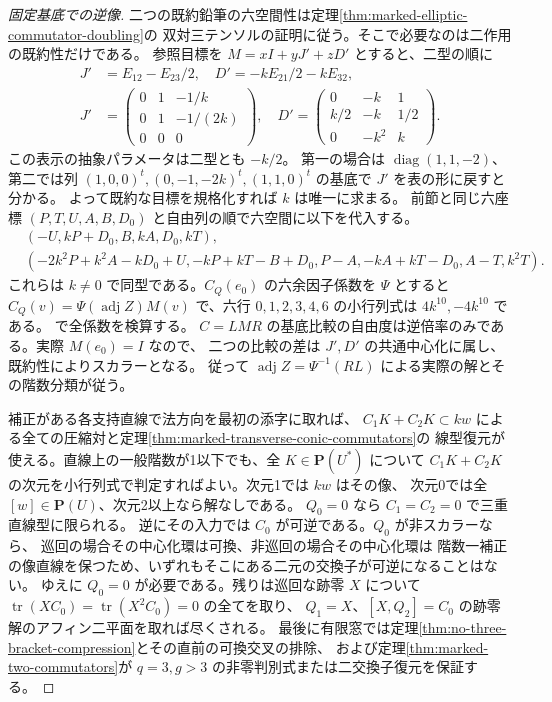 \begin{proof}[固定基底での逆像]
二つの既約鉛筆の六空間性は定理\ref{thm:marked-elliptic-commutator-doubling}の
双対三テンソルの証明に従う。そこで必要なのは二作用の既約性だけである。
参照目標を $M=xI+yJ'+zD'$ とすると、二型の順に
\[
\begin{split}
 J'&=E_{12}-E_{23}/2,\quad D'=-k E_{21}/2-k E_{32},\\
 J'&=\begin{pmatrix}0&1&-1/k\\0&1&-1/(2k)\\0&0&0\end{pmatrix},\quad
 D'=\begin{pmatrix}0&-k&1\\ k/2&-k&1/2\\0&-k^2&k\end{pmatrix}.
\end{split}
\]
この表示の抽象パラメータは二型とも $-k/2$。
第一の場合は $\operatorname{diag}(1,1,-2)$、
第二では列 $(1,0,0)^t,(0,-1,-2k)^t,(1,1,0)^t$ の基底で $J'$ を表の形に戻すと分かる。
よって既約な目標を規格化すれば $k$ は唯一に求まる。
前節と同じ六座標 $(P,T,U,A,B,D_0)$ と自由列の順で六空間に以下を代入する。
\[
\begin{split}
 &(-U,kP+D_0,B,kA,D_0,kT),\\
 &(-2k^2P+k^2A-kD_0+U,-kP+kT-B+D_0,P-A,-kA+kT-D_0,A-T,k^2T).
\end{split}
\]
これらは $k\ne0$ で同型である。$C_Q(e_0)$ の六余因子係数を $\Psi$ とすると
$C_Q(v)=\Psi(\operatorname{adj}Z)M(v)$ で、六行 $0,1,2,3,4,6$ の小行列式は
$4k^{10},-4k^{10}$ である。 で全係数を検算する。
$C=L M R$ の基底比較の自由度は逆倍率のみである。実際 $M(e_0)=I$ なので、
二つの比較の差は $J',D'$ の共通中心化に属し、既約性によりスカラーとなる。
従って $\operatorname{adj}Z=\Psi^{-1}(RL)$ による実際の解とその階数分類が従う。

補正がある各支持直線で法方向を最初の添字に取れば、
$C_1K+C_2K\subset kw$ による全ての圧縮対と定理\ref{thm:marked-transverse-conic-commutators}の
線型復元が使える。直線上の一般階数が1以下でも、全 $K\in\mathbf P(U^*)$ について
$C_1K+C_2K$ の次元を小行列式で判定すればよい。次元1では $kw$ はその像、
次元0では全 $[w]\in\mathbf P(U)$、次元2以上なら解なしである。
$Q_0=0$ なら $C_1=C_2=0$ で三重直線型に限られる。
逆にその入力では $C_0$ が可逆である。$Q_0$ が非スカラーなら、
巡回の場合その中心化環は可換、非巡回の場合その中心化環は
階数一補正の像直線を保つため、いずれもそこにある二元の交換子が可逆になることはない。
ゆえに $Q_0=0$ が必要である。残りは巡回な跡零 $X$ について
$\operatorname{tr}(XC_0)=\operatorname{tr}(X^2 C_0)=0$ の全てを取り、
$Q_1=X$、$[X,Q_2]=C_0$ の跡零解のアフィン二平面を取れば尽くされる。
最後に有限窓では定理\ref{thm:no-three-bracket-compression}とその直前の可換交叉の排除、
および定理\ref{thm:marked-two-commutators}が $q=3,g>3$ の非零判別式または二交換子復元を保証する。
\end{proof}
